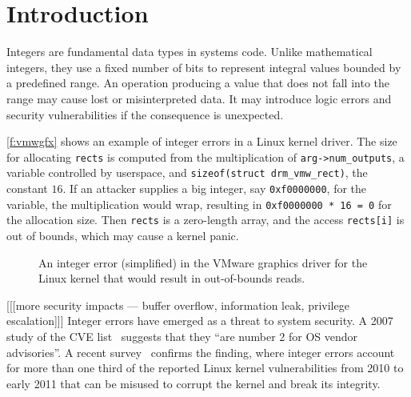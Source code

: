 \section{Introduction}
\label{s:intro}

Integers are fundamental data types in systems code.  Unlike
mathematical integers, they use a fixed number of bits to represent
integral values bounded by a predefined range.  An operation producing
a value that does not fall into the range may cause lost or
misinterpreted data.  It may introduce logic errors and security
vulnerabilities if the consequence is unexpected.

\autoref{f:vmwgfx} shows an example of integer errors in a Linux
kernel driver.  The size for allocating \lstinline!rects! is computed
from the multiplication of \lstinline!arg->num_outputs!, a variable
controlled by userspace, and \lstinline!sizeof(struct drm_vmw_rect)!,
the constant $16$.  If an attacker supplies a big integer, say
\lstinline!0xf0000000!, for the variable, the multiplication would
wrap, resulting in \lstinline!0xf0000000 * 16 = 0! for the allocation
size.  Then \lstinline!rects! is a zero-length array, and the access
\lstinline!rects[i]! is out of bounds, which may cause a kernel
panic.

\begin{figure}[h]

\caption{An integer error (simplified) in the VMware graphics driver
for the Linux kernel that would result in out-of-bounds reads.}
\label{f:vmwgfx}
\end{figure}

[[[more security impacts --- buffer overflow, information leak,
privilege escalation]]]
Integer errors have emerged as a threat to system security.  A 2007
study of the CVE list~\cite{christey:vuln} suggests that they ``are
number 2 for OS vendor advisories''.  A recent survey~\cite{chen:kbugs}
confirms the finding, where integer errors account for more than
one third of the reported Linux kernel vulnerabilities from 2010
to early 2011 that can be misused to corrupt the kernel and break
its integrity.

